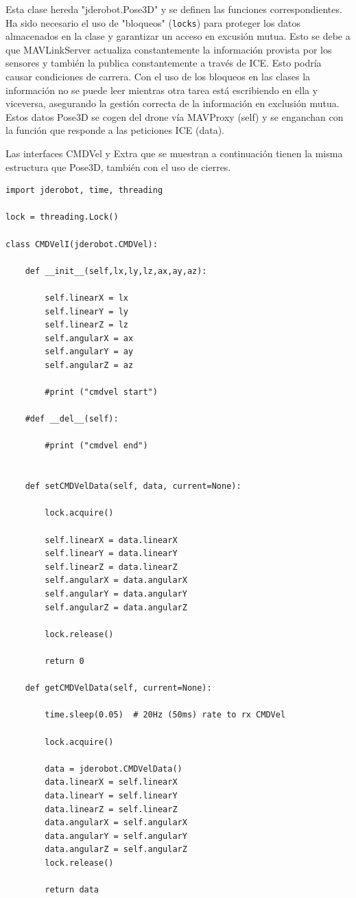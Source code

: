 Esta clase hereda "jderobot.Pose3D" y se definen las funciones correspondientes. Ha sido necesario el uso de "bloqueos" (\texttt{locks}) para proteger los datos almacenados en la clase y garantizar un acceso en excusión mutua. Esto se debe a que MAVLinkServer actualiza constantemente la información provista por los sensores y también la publica constantemente a través de ICE. Esto podría causar condiciones de carrera. Con el uso de los bloqueos en las clases la información no se puede leer mientras otra tarea está escribiendo en ella y viceversa, asegurando la gestión correcta de la información en exclusión mutua. Estos datos Pose3D se cogen del drone vía MAVProxy (self) y se enganchan con la función que responde a las peticiones ICE (data).

Las interfaces CMDVel y Extra que se muestran a continuación tienen la misma estructura que Pose3D, también con el uso de cierres.

\begin{lstlisting}[frame=single]
import jderobot, time, threading

lock = threading.Lock()

class CMDVelI(jderobot.CMDVel):

    def __init__(self,lx,ly,lz,ax,ay,az):

        self.linearX = lx
        self.linearY = ly
        self.linearZ = lz
        self.angularX = ax
        self.angularY = ay
        self.angularZ = az

        #print ("cmdvel start")

    #def __del__(self):

        #print ("cmdvel end")


    def setCMDVelData(self, data, current=None):

        lock.acquire()

        self.linearX = data.linearX
        self.linearY = data.linearY
        self.linearZ = data.linearZ
        self.angularX = data.angularX
        self.angularY = data.angularY
        self.angularZ = data.angularZ

        lock.release()

        return 0

    def getCMDVelData(self, current=None):

        time.sleep(0.05)  # 20Hz (50ms) rate to rx CMDVel

        lock.acquire()

        data = jderobot.CMDVelData()
        data.linearX = self.linearX
        data.linearY = self.linearY
        data.linearZ = self.linearZ
        data.angularX = self.angularX
        data.angularY = self.angularY
        data.angularZ = self.angularZ
        lock.release()

        return data
        
\end{lstlisting} 

